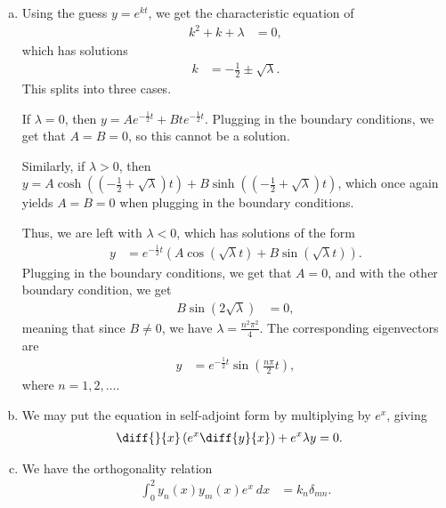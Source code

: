 \documentclass[10pt]{mypackage}
\begin{document}
\begin{solution}[11.4, Problem 8]\hfill
  \begin{enumerate}[(a)]
    \item Using the guess $y = e^{kt}$, we get the characteristic equation of
      \begin{align*}
        k^2 + k + \lambda &= 0,
      \end{align*}
      which has solutions
      \begin{align*}
        k &= -\frac{1}{2}\pm \sqrt{\lambda}.
      \end{align*}
      This splits into three cases.\newline

      If $\lambda = 0$, then $y = Ae^{-\frac{1}{2}t} + Bte^{-\frac{1}{2}t}$. Plugging in the boundary conditions, we get that $A = B = 0$, so this cannot be a solution.\newline

      Similarly, if $\lambda > 0$, then $y = A\cosh\left( \left( -\frac{1}{2} + \sqrt{\lambda} \right)t \right) + B\sinh\left( \left( -\frac{1}{2} + \sqrt{\lambda} \right)t \right)$, which once again yields $A = B = 0$ when plugging in the boundary conditions.\newline

      Thus, we are left with $\lambda < 0$, which has solutions of the form
      \begin{align*}
        y &= e^{-\frac{1}{2}t} \left( A \cos\left( \sqrt{\lambda} t \right) + B\sin\left( \sqrt{\lambda} t \right) \right).
      \end{align*}
      Plugging in the boundary conditions, we get that $A = 0$, and with the other boundary condition, we get
      \begin{align*}
        B\sin\left( 2\sqrt{\lambda} \right) &= 0,
      \end{align*}
      meaning that since $B\neq 0$, we have $\lambda = \frac{n^2\pi^2}{4}$. The corresponding eigenvectors are
      \begin{align*}
        y &= e^{-\frac{1}{2}t} \sin\left( \frac{n\pi}{2} t \right),
      \end{align*}
      where $n = 1,2,\dots$.
    \item We may put the equation in self-adjoint form by multiplying by $e^{x}$, giving
      \begin{align*}
        \diff{}{x}\left( e^{x}\diff{y}{x} \right) + e^{x}\lambda y &= 0.
      \end{align*}
    \item We have the orthogonality relation
      \begin{align*}
        \int_{0}^{2} y_n(x)y_m(x)e^{x}\:dx &= k_n\delta_{mn}.
      \end{align*}
  \end{enumerate}
\end{solution}
\end{document}
